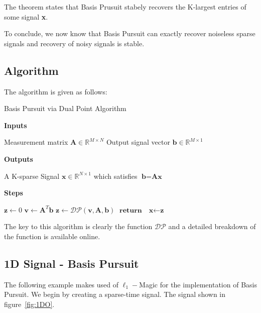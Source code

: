 \documentclass[titlepage,oneside, 12pt]{book}
\theoremstyle{break}
\begin{document}
The theorem states that Basis Prusuit stabely recovers the K-largest entries of some signal \textbf{x}. 

To conclude, we now know that Basis Pursuit can exactly recover noiseless sparse signals and recovery of noisy signals is stable. 

\newpage

\subsection{Algorithm}

The algorithm is given as follows:

\begin{algorithm}
  \caption{Basis Pursuit via Dual Point Algorithm}
  \bigskip	
  \textbf{Inputs}%
  \begin{algorithmic}[1]
   \State Measurement matrix $\textbf{A} \in \mathbb{R}^{M \times N}$
   \State Output signal vector $\textbf{b} \in \mathbb{R}^{M \times 1}$
  \end{algorithmic}
  \bigskip  
  \textbf{Outputs}%
  \begin{algorithmic}[1]
    \State A K-sparse Signal $\textbf{x}\in \mathbb{R}^{N \times 1}$ which satisfies $\textbf{b} = \textbf{A}\textbf{x}$
  \end{algorithmic}
  \bigskip
  \textbf{Steps}%
  \begin{algorithmic}[1]
\State $\textbf{z} \gets 0$
   \State $\textbf{v} \gets \textbf{A}^{T}\textbf{b}$  
   \State $\textbf{z} \gets \mathcal{DP}(\textbf{v},\textbf{A},\textbf{b})$  
   \State $\textbf{return} \quad \textbf{x} \gets \textbf{z}$
   \EndProcedure
   \end{algorithmic}

   \end{algorithm}
   
    The key to this algorithm is clearly the function $\mathcal{DP}$ and a detailed breakdown of the function is available online\cite{L1Magic}.

\newpage

\subsection{1D Signal - Basis Pursuit}

The following example makes used of $\ell_1-$Magic\cite{L1Magic} for the implementation of Basis Pursuit. We begin by creating a sparse-time signal. The signal shown in figure~\ref{fig:1DO}. 
\end{document}
